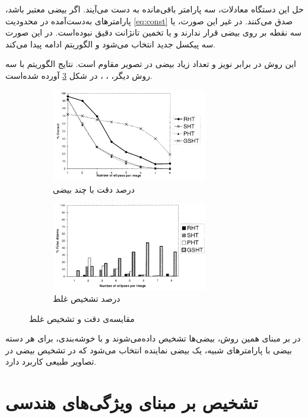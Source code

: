 \documentclass[12pt,a4paper]{article}
\numberwithin{equation}{section}
\numberwithin{figure}{section}
\theoremstyle{definition}
\theoremstyle{theorem}
\theoremstyle{definition}
\begin{document}
حل این دستگاه معادلات، سه پارامتر باقی‌مانده به دست می‌آیند. اگر بیضی معتبر باشد، پارامترهای به‌دست‌آمده در محدودیت \ref{eq:const} صدق می‌کنند. در غیر این صورت، یا سه نقطه بر روی بیضی قرار ندارند و یا تخمین تانژانت دقیق نبوده‌است. در این صورت سه پیکسل جدید انتخاب می‌شود و الگوریتم ادامه پیدا می‌کند. 

این روش در برابر نویز و تعداد زیاد بیضی در تصویر مقاوم است. نتایج الگوریتم با سه روش دیگر،
 \cite{PHT}، 
 \cite{rht-cent}،
 \cite{GSHT}
در شکل \ref{fig:rht-c1} آورده شده‌است. 


\begin{figure}[h]
\centering
\begin{subfigure}{0.5\textwidth}
  \centering
  \includegraphics[width=6.8cm]{rht1.png}
  \caption{درصد دقت با چند بیضی}
  \label{fig:rht1}
\end{subfigure}%
\begin{subfigure}{0.5\textwidth}
  \centering
  \includegraphics[width=6.8cm]{rht2.png}
  \caption{درصد تشخیص غلط}
  \label{fig:rht2}
\end{subfigure}
\caption{مقایسه‌ی دقت و تشخیص غلط \cite{RHT}}
\label{fig:rht-c1}
\end{figure}

در \cite{cluster} بر مبنای همین روش، بیضی‌ها تشخیص داده‌می‌شوند و با خوشه‌بندی، برای هر دسته بیضی با پارامترهای شبیه، یک بیضی نماینده انتخاب می‌شود که در تشخیص بیضی در تصاویر طبیعی کاربرد دارد.


\newpage

\section{تشخیص بر مبنای ویژگی‌های هندسی}
\end{document}
